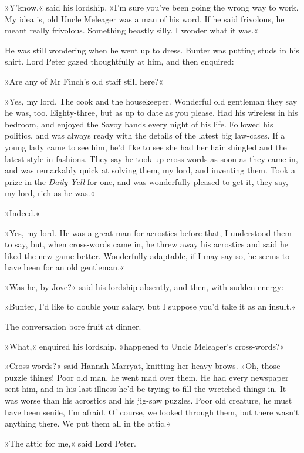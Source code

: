 »Y'know,« said his lordship, »I'm sure you've been going the wrong way to work. My idea is, old Uncle Meleager was a man of his word. If he said frivolous, he meant really frivolous. Something beastly silly. I wonder what it was.«

He was still wondering when he went up to dress. Bunter was putting studs in his shirt. Lord Peter gazed thoughtfully at him, and then enquired:

»Are any of Mr Finch's old staff still here?«

»Yes, my lord. The cook and the housekeeper. Wonderful old gentleman they say he was, too. Eighty-three, but as up to date as you please. Had his wireless in his bedroom, and enjoyed the Savoy bands every night of his life. Followed his politics, and was always ready with the details of the latest big law-cases. If a young lady came to see him, he'd like to see she had her hair shingled and the latest style in fashions. They say he took up cross-words as soon as they came in, and was remarkably quick at solving them, my lord, and inventing them. Took a  prize in the \textit{Daily Yell} for one, and was wonderfully pleased to get it, they say, my lord, rich as he was.«

»Indeed.«

»Yes, my lord. He was a great man for acrostics before that, I understood them to say, but, when cross-words came in, he threw away his acrostics and said he liked the new game better. Wonderfully adaptable, if I may say so, he seems to have been for an old gentleman.«

»Was he, by Jove?« said his lordship absently, and then, with sudden energy:

»Bunter, I'd like to double your salary, but I suppose you'd take it as an insult.«

The conversation bore fruit at dinner.

»What,« enquired his lordship, »happened to Uncle Meleager's cross-words?«

»Cross-words?« said Hannah Marryat, knitting her heavy brows. »Oh, those puzzle things! Poor old man, he went mad over them. He had every newspaper sent him, and in his last illness he'd be trying to fill the wretched things in. It was worse than his acrostics and his jig-saw puzzles. Poor old creature, he must have been senile, I'm afraid. Of course, we looked through them, but there wasn't anything there. We put them all in the attic.«

»The attic for me,« said Lord Peter.

